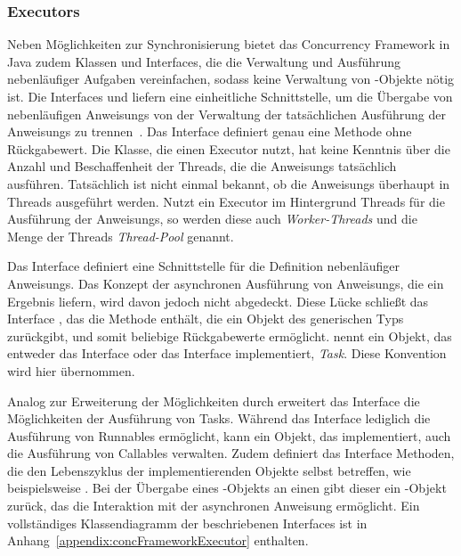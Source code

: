 \subsubsection{Executors}\label{sec:executor} Neben Möglichkeiten zur Synchronisierung bietet das Concurrency Framework in Java zudem Klassen und Interfaces, die die Verwaltung und Ausführung nebenläufiger Aufgaben vereinfachen, sodass keine Verwaltung von -Objekte nötig ist. Die Interfaces  und  liefern eine einheitliche Schnittstelle, um die Übergabe von nebenläufigen \glspl{Anweisung} von der Verwaltung der tatsächlichen Ausführung der \glspl{Anweisung} zu trennen~\cite[S.~70~ff.]{Friesen2015}. Das Interface  definiert genau eine Methode  ohne Rückgabewert. Die Klasse, die einen Executor nutzt, hat keine Kenntnis über die Anzahl und Beschaffenheit der Threads, die die \glspl{Anweisung} tatsächlich ausführen. Tatsächlich ist nicht einmal bekannt, ob die \glspl{Anweisung} überhaupt in Threads ausgeführt werden. Nutzt ein Executor im Hintergrund Threads für die Ausführung der \glspl{Anweisung}, so werden diese auch \emph{Worker-Threads} und die Menge der Threads \emph{Thread-Pool} genannt.

Das Interface  definiert eine Schnittstelle für die Definition nebenläufiger \glspl{Anweisung}. Das Konzept der asynchronen Ausführung von \glspl{Anweisung}, die ein Ergebnis liefern, wird davon jedoch nicht abgedeckt. Diese Lücke schließt das Interface , das die Methode  enthält, die ein Objekt des generischen Typs  zurückgibt, und somit beliebige Rückgabewerte ermöglicht. \textcite{Friesen2015} nennt ein Objekt, das entweder das Interface  oder das Interface  implementiert, \emph{Task}. Diese Konvention wird hier übernommen. 

Analog zur Erweiterung der Möglichkeiten durch  erweitert das Interface  die Möglichkeiten der Ausführung von Tasks. Während das Interface  lediglich die Ausführung von Runnables ermöglicht, kann ein Objekt, das  implementiert, auch die Ausführung von Callables verwalten. Zudem definiert das Interface Methoden, die den Lebenszyklus der implementierenden Objekte selbst betreffen, wie beispielsweise . Bei der Übergabe eines -Objekts an einen  gibt dieser ein -Objekt zurück, das die Interaktion mit der asynchronen \gls{Anweisung} ermöglicht. Ein vollständiges Klassendiagramm der beschriebenen Interfaces ist in Anhang~\ref{appendix:concFrameworkExecutor} enthalten.

